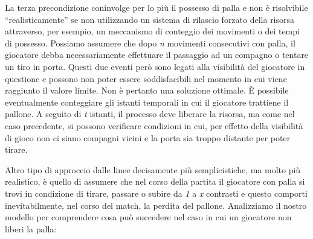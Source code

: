 \documentclass[aps,letterpaper,10pt]{article}
\begin{document}
La terza precondizione coninvolge per lo pi\`u il possesso di palla e non \`e risolvibile ``realisticamente'' se non utilizzando un sistema di rilascio forzato della risorsa attraverso, per esempio, un meccanismo di conteggio dei movimenti o dei tempi di possesso. Possiamo assumere che dopo \emph{n} movimenti consecutivi con palla, il giocatore debba necessariamente effettuare il passaggio ad un compagno o tentare un tiro in porta. Questi due eventi per\`o sono legati alla visibilit\`a del giocatore in questione e possono non poter essere soddisfacibili nel momento in cui viene raggiunto il valore limite. Non \`e pertanto una soluzione ottimale. \`E possibile eventualmente conteggiare gli istanti temporali in cui il giocatore trattiene il pallone. A seguito di \emph{t} istanti, il processo deve liberare la risorsa, ma come nel caso precedente, si possono verificare condizioni in cui, per effetto della visibilit\`a di gioco non ci siano compagni vicini e la porta sia troppo distante per poter tirare. \vspace{3mm}

Altro tipo di approccio dalle linee decisamente pi\`u semplicistiche, ma molto pi\`u realistico, \`e quello di assumere che nel corso della partita il giocatore con palla si trovi in condizione di tirare, passare o subire da \emph{1} a \emph{x} contrasti e questo comporti inevitabilmente, nel corso del match, la perdita del pallone. Analizziamo il nostro modello per comprendere cosa pu\`o succedere nel caso in cui un giocatore non liberi la palla:
\end{document}

